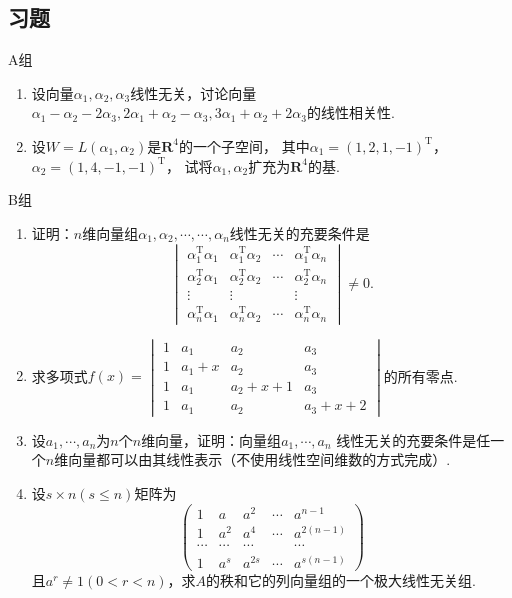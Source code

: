 \subsection{习题}
\centerline{\heiti A组}
\begin{enumerate}
	\item 设向量$\alpha_1,\alpha_2,\alpha_3$线性无关，讨论向量$\alpha_1-\alpha_2-2\alpha_3,
	2\alpha_1+\alpha_2-\alpha_3,3\alpha_1+\alpha_2+2\alpha_3$的线性相关性.
	\item 设$W=L(\alpha_1,\alpha_2)$是$\mathbf{R}^4$的一个子空间，
	其中$\alpha_1=(1,2,1,-1)^\mathrm{T}$，$\alpha_2=(1,4,-1,-1)^\mathrm{T}$，
	试将$\alpha_1,\alpha_2$扩充为$\mathbf{R}^4$的基.
\end{enumerate}
\centerline{\heiti B组}
\begin{enumerate}
	\item 证明：$n$维向量组$\alpha_1,\alpha_2,\cdots,\cdots,\alpha_n$线性无关的充要条件是$$\begin{vmatrix}
		\alpha_1^\mathrm{T}\alpha_1 & \alpha_1^\mathrm{T}\alpha_2 & \cdots & \alpha_1^\mathrm{T}\alpha_n \\
		\alpha_2^\mathrm{T}\alpha_1 & \alpha_2^\mathrm{T}\alpha_2 & \cdots & \alpha_2^\mathrm{T}\alpha_n \\
		\vdots & \vdots &  & \vdots \\
		\alpha_n^\mathrm{T}\alpha_1 & \alpha_n^\mathrm{T}\alpha_2 & \cdots & \alpha_n^\mathrm{T}\alpha_n
	\end{vmatrix}\neq 0.$$
	\item 求多项式$f(x)=\begin{vmatrix}
		1 & a_1 & a_2 & a_3 \\
		1 & a_1+x & a_2 & a_3 \\
		1 & a_1 & a_2+x+1 & a_3 \\
		1 & a_1 & a_2 & a_3+x+2
	\end{vmatrix}$的所有零点.
	\item 设$a_1,\cdots,a_n$为$n$个$n$维向量，证明：向量组$a_1,\cdots,a_n$
	线性无关的充要条件是任一个$n$维向量都可以由其线性表示（不使用线性空间维数的方式完成）.
	\item 设$s \times n(s\le n)$矩阵为
	$$\begin{pmatrix}
		1 & a & a^2 & \cdots & a^{n-1} \\
		1 & a^2 & a^4 & \cdots & a^{2(n-1)} \\
		\cdots & \cdots & \cdots &  & \cdots \\
		1 & a^s & a^{2s} & \cdots & a^{s(n-1)}
	\end{pmatrix}$$
	且$a^r\neq 1(0<r<n)$，求$A$的秩和它的列向量组的一个极大线性无关组.
\end{enumerate}
